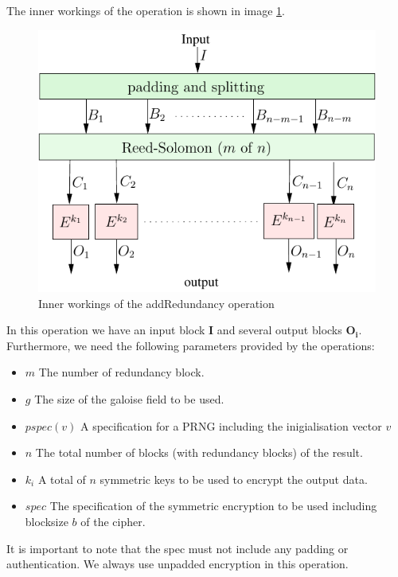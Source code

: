 The inner workings  of the operation is shown in image \ref{fig:addRedundancyOp}.
\begin{figure}[ht!]
	\centering\includegraphics[width=\columnwidth]{inc/addRedundancyOp.pdf}
	\caption{Inner workings of the addRedundancy operation}\label{fig:addRedundancyOp}
\end{figure}

In this operation we have an input block $\mathbf{I}$ and several output blocks $\mathbf{O_i}$. Furthermore, we need the following parameters provided by the operations:

\begin{itemize}
	\item $m$ The number of redundancy block.
	\item $g$ The size of the galoise field to be used.
	\item $pspec(v)$ A specification for a PRNG including the inigialisation vector $v$
	\item $n$ The total number of blocks (with redundancy blocks) of the result.
	\item $k_i$ A total of $n$ symmetric keys to be used to encrypt the output data.
	\item $spec$ The specification of the symmetric encryption to be used including blocksize $b$ of the cipher.
\end{itemize}

It is important to note that the spec must not include any padding or authentication. We always use unpadded encryption in this operation.

